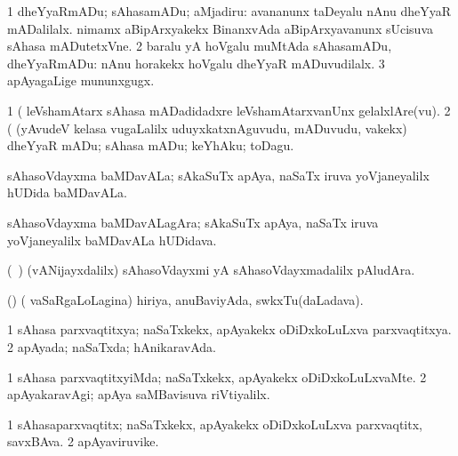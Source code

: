 \noindent
\gl{\akirx}
\expl{}
\bmng
\bnum
\num{1} dheYyaRmADu; sAhasamADu; aMjadiru:  avananunx taDeyalu nAnu dheYyaR mADalilalx.  nimamx aBipArxyakekx BinanxvAda aBipArxyavanunx sUcisuva sAhasa mADutetxVne. 
\num{2} baralu yA hoVgalu muMtAda sAhasamADu, dheYyaRmADu:  nAnu horakekx hoVgalu dheYyaR mADuvudilalx. 
\num{3} apAyagaLige mununxgugx. 
\enum
\emng

\noindent 
\gl{\pagu}
\expl{}
\bmng
\bnum
\num{1}  (    leVshamAtarx sAhasa mADadidadxre leVshamAtarxvanUnx gelalxlAre(vu). 
\num{2}  (  (yAvudeV kelasa \mo vugaLalilx uduyxkatxnAguvudu, mADuvudu, \mo vakekx) dheYyaR mADu; sAhasa mADu; keYhAku; toDagu. 
\enum
\emng
\eentry

\bentry
{}
\gl{\nA}
\expl{}
\bmng
 sAhasoVdayxma baMDavALa; sAkaSuTx apAya, naSaTx iruva yoVjaneyalilx hUDida baMDavALa. 
\emng
\eentry

\bentry
{}
\gl{\nA}
\expl{}
\bmng
 sAhasoVdayxma baMDavALagAra; sAkaSuTx apAya, naSaTx iruva yoVjaneyalilx baMDavALa hUDidava. 
\emng
\eentry

\bentry
{} 
\gl{\nA}
\expl{}
\bmng
 (\kanmu\ \ca) (vANijayxdalilx) sAhasoVdayxmi yA sAhasoVdayxmadalilx pAludAra. 
\emng
\eentry

\bentry
{}
\gl{\nA}
\expl{}
\bmng
 (\birx) ( vaSaRgaLoLagina) hiriya, anuBaviyAda, swkxTu(daLadava). 
\emng
\eentry

\bentry
{} 
\gl{\gu}
\expl{}
\bmng
\bnum
\num{1} sAhasa parxvaqtitxya; naSaTxkekx, apAyakekx oDiDxkoLuLxva parxvaqtitxya. 
\num{2} apAyada; naSaTxda; hAnikaravAda. 
\enum
\emng
\eentry

\bentry
{} 
\gl{\kirxvi}
\expl{}
\bmng
\bnum
\num{1} sAhasa parxvaqtitxyiMda; naSaTxkekx, apAyakekx oDiDxkoLuLxvaMte. 
\num{2} apAyakaravAgi; apAya saMBavisuva riVtiyalilx. 
\enum
\emng
\eentry

\bentry
{} 
\gl{\nA}
\expl{}
\bmng
\bnum
\num{1} sAhasaparxvaqtitx; naSaTxkekx, apAyakekx oDiDxkoLuLxva parxvaqtitx, savxBAva. 
\num{2} apAyaviruvike. 
\enum
\emng
\eentry

